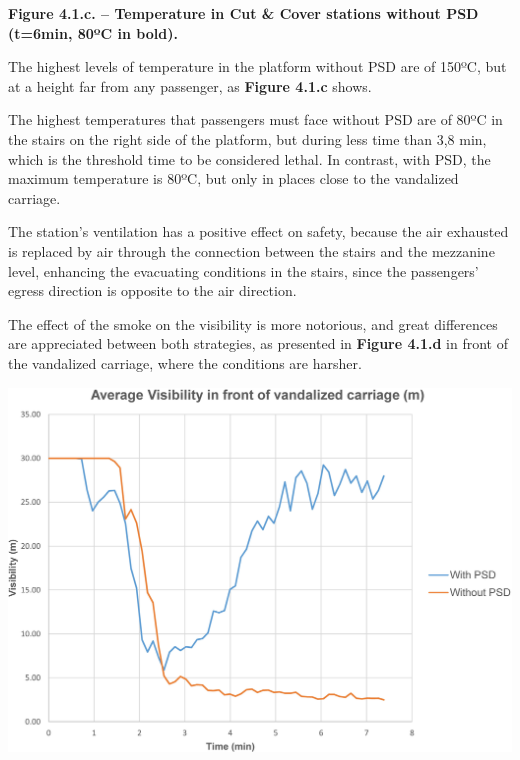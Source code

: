\documentclass{article}
\begin{document}
\begin{mdcenter}%

\noindent{}\textbf{Figure 4.1.c. – Temperature in Cut \& Cover stations without PSD 
(t=6min, 80ºC in bold).}%
\end{mdcenter}%

\noindent{}The highest levels of temperature in the platform without PSD are of 150ºC, 
but at a height far from any passenger, as \textbf{Figure 4.1.c} shows.%

The highest temperatures that passengers must face without PSD are of 80ºC 
in the stairs on the right side of the platform, but during less time than 
3,8 min, which is the threshold time to be considered lethal. In contrast, 
with PSD, the maximum temperature is 80ºC, but only in places close to the 
vandalized carriage.%

The station’s ventilation has a positive effect on safety, because the air 
exhausted is replaced by air through the connection between the stairs and 
the mezzanine level, enhancing the evacuating conditions in the stairs, 
since the passengers’ egress direction is opposite to the air direction.%

The effect of the smoke on the visibility is more notorious, and great 
differences are appreciated between both strategies, as presented in 
\textbf{Figure 4.1.d} in front of the vandalized carriage, where the conditions 
are harsher.%

\begin{mdcenter}%

\noindent{}\includegraphics[keepaspectratio=true,width=\dimmin{}{\dimwidth{0.55}}]{images/Fig-4.1.d}{}%
\end{mdcenter}%
\end{document}
